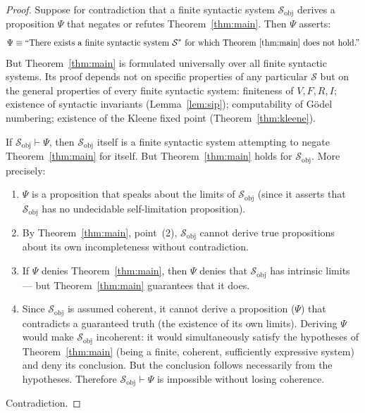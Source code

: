 \documentclass[11pt]{article}
\begin{document}
\begin{proof}
Suppose for contradiction that a finite syntactic system
$\mathcal{S}_{\mathrm{obj}}$ derives a proposition $\Psi$ that negates
or refutes Theorem~\ref{thm:main}. Then $\Psi$ asserts:
\[
  \Psi \equiv \text{``There exists a finite syntactic system }
  \mathcal{S}^* \text{ for which Theorem~\ref{thm:main} does not
  hold.''}
\]
But Theorem~\ref{thm:main} is formulated universally over all finite
syntactic systems. Its proof depends not on specific properties of any
particular $\mathcal{S}$ but on the general properties of every finite
syntactic system: finiteness of $V, F, R, I$; existence of syntactic
invariants (Lemma~\ref{lem:sip}); computability of G\"odel numbering;
existence of the Kleene fixed point (Theorem~\ref{thm:kleene}).

If $\mathcal{S}_{\mathrm{obj}} \vdash \Psi$, then
$\mathcal{S}_{\mathrm{obj}}$ itself is a finite syntactic system
attempting to negate Theorem~\ref{thm:main} for itself. But
Theorem~\ref{thm:main} holds for $\mathcal{S}_{\mathrm{obj}}$. More
precisely:

\begin{enumerate}
  \item $\Psi$ is a proposition that speaks about the limits of
        $\mathcal{S}_{\mathrm{obj}}$ (since it asserts that
        $\mathcal{S}_{\mathrm{obj}}$ has no undecidable self-limitation
        proposition).
  \item By Theorem~\ref{thm:main}, point~(2),
        $\mathcal{S}_{\mathrm{obj}}$ cannot derive true propositions
        about its own incompleteness without contradiction.
  \item If $\Psi$ denies Theorem~\ref{thm:main}, then $\Psi$ denies
        that $\mathcal{S}_{\mathrm{obj}}$ has intrinsic limits --- but
        Theorem~\ref{thm:main} guarantees that it does.
  \item Since $\mathcal{S}_{\mathrm{obj}}$ is assumed coherent, it
        cannot derive a proposition ($\Psi$) that contradicts a
        guaranteed truth (the existence of its own limits). Deriving
        $\Psi$ would make $\mathcal{S}_{\mathrm{obj}}$ incoherent: it
        would simultaneously satisfy the hypotheses of
        Theorem~\ref{thm:main} (being a finite, coherent, sufficiently
        expressive system) and deny its conclusion. But the conclusion
        follows necessarily from the hypotheses. Therefore
        $\mathcal{S}_{\mathrm{obj}} \vdash \Psi$ is impossible without
        losing coherence.
\end{enumerate}

Contradiction.
\end{proof}
\end{document}
